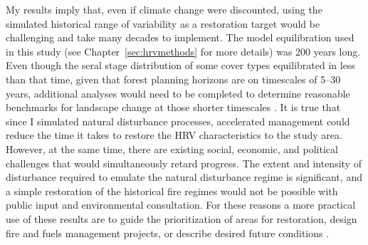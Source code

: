 



My results imply that, even if climate change were discounted, using the simulated historical range of variability as a restoration target would be challenging and take many decades to implement. The model equilibration used in this study (see Chapter~\ref{sec:hrvmethods} for more details) was 200 years long. Even though the seral stage distribution of some cover types equilibrated in less than that time, given that forest planning horizons are on timescales of 5--30 years, additional analyses would need to be completed to determine reasonable benchmarks for landscape change at those shorter timescales \citep{Millar1999,Millar2014}. It is true that since I simulated natural disturbance processes, accelerated management could reduce the time it takes to restore the HRV characteristics to the study area. However, at the same time, there are existing social, economic, and political challenges that would simultaneously retard progress. The extent and intensity of disturbance required to emulate the natural disturbance regime is significant, and a simple restoration of the historical fire regimes would not be possible with public input and environmental consultation. For these reasons a more practical use of these results are to guide the prioritization of areas for restoration, design fire and fuels management projects, or describe desired future conditions \citep{Keeley2000,Fule2008,Safford2014}.

